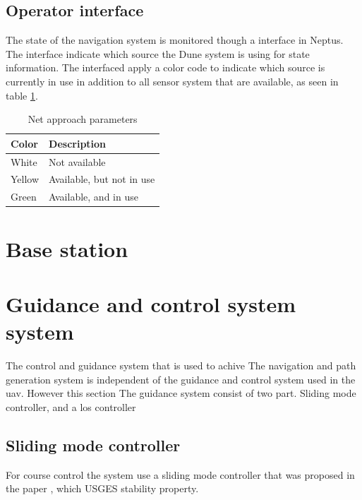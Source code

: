 
\subsection{Operator interface}
The state of the navigation system is monitored though a interface in Neptus. The interface indicate which source the Dune system is using for state information. The interfaced apply a color code to indicate which source is currently in use in addition to all sensor system that are available, as seen in table \ref{Tb:Color Code}.
\begin{table}[H]
\begin{center}
    \begin{tabular}{ | l | l |}
    \hline
    \textbf{Color} & \textbf{Description} \\ \hline
    White & Not available \\ \hline
    Yellow & Available, but not in use \\ \hline
    Green & Available, and in use \\ \hline
    \end{tabular}
\end{center}
\caption{Net approach parameters }
\label{Tb:Color Code}
\end{table}
\section{Base station}

\section{Guidance and control system system}
The control and guidance system that is used to achive 
The navigation and path generation system is independent of the guidance and control system used in the \gls{uav}. However this section 
The guidance system consist of two part. Sliding mode controller, and a los controller

\subsection{Sliding mode controller}
For course control the system use a sliding mode controller that was proposed in the paper \citep{fortuna2015cascaded}, which USGES stability property.